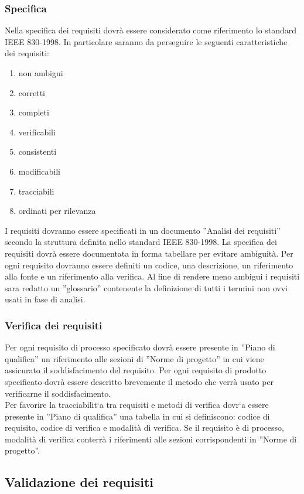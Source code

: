 {{			\subsubsection{Specifica}{
				Nella specifica dei requisiti dovrà essere considerato come riferimento lo standard IEEE 830-1998. In particolare saranno da perseguire le seguenti caratteristiche dei requisiti:
				\begin{enumerate}
					\item non ambigui
					\item corretti
					\item completi
					\item verificabili
					\item consistenti
					\item modificabili
					\item tracciabili
					\item ordinati per rilevanza
				\end{enumerate}
				I requisiti dovranno essere specificati in un documento ”Analisi dei requisiti” secondo la struttura definita nello standard IEEE 830-1998. La specifica dei requisiti dovrà essere documentata in forma tabellare per evitare ambiguità. Per ogni requisito dovranno essere definiti un codice, una descrizione, un riferimento alla fonte e un riferimento alla verifica. Al fine di rendere meno ambigui i requisiti sara redatto un ”glossario” contenente la definizione di tutti i termini non ovvi usati in fase di analisi.
			}
			\subsubsection{Verifica dei requisiti}{
				Per ogni requisito di processo specificato dovrà essere presente in ”Piano di qualifica” un riferimento alle sezioni di ”Norme di progetto” in cui viene assicurato il soddisfacimento del requisito. Per ogni requisito di prodotto specificato dovrà essere descritto brevemente il metodo che verrà usato per verificarne il soddisfacimento.\\Per favorire la tracciabilit`a tra requisiti e metodi di verifica dovr`a essere presente in ”Piano di qualifica” una tabella in cui si definiscono: codice di requisito, codice di verifica e modalità di verifica. Se il requisito è di processo, modalità di verifica conterrà i riferimenti alle sezioni corrispondenti in ”Norme di progetto”.
			}
		}
		\subsection{Validazione dei requisiti}{
}}
